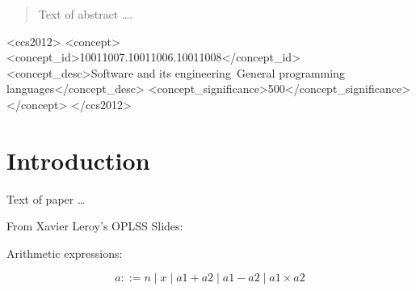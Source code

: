 \documentclass[sigplan,10pt,review,anonymous]{acmart}\settopmatter{printfolios=true,printccs=false,printacmref=false}
\begin{document}
\begin{abstract}
Text of abstract \ldots.
\end{abstract}


\begin{CCSXML}
<ccs2012>
<concept>
<concept_id>10011007.10011006.10011008</concept_id>
<concept_desc>Software and its engineering~General programming languages</concept_desc>
<concept_significance>500</concept_significance>
</concept>
</ccs2012>
\end{CCSXML}





\maketitle


\section{Introduction}

Text of paper \ldots

From Xavier Leroy's OPLSS Slides:


Arithmetic expressions:

\[a ::= n \mid x \mid a1 + a2 \mid a1 - a2 \mid a1 \times a2\]
\end{document}
